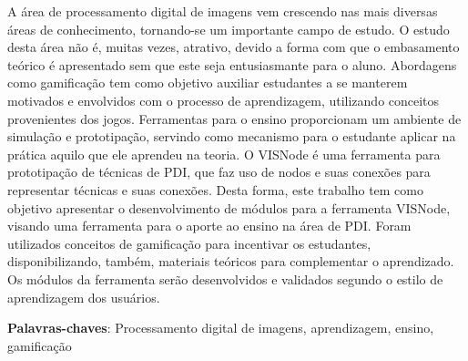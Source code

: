 \documentclass[
	12pt,				%
	oneside,			%
	a4paper,			%
	english,			%
	french,				%
	spanish,			%
	brazil,				%
	]{abntex2}
\begin{document}
\frenchspacing 


\imprimircapa
\imprimirfolhaderosto





\begin{resumo}
A área de processamento digital de imagens vem crescendo nas mais diversas áreas de conhecimento, tornando-se um importante campo de estudo. O estudo desta área não é, muitas vezes, atrativo, devido a forma com que o embasamento teórico é apresentado sem que este seja entusiasmante para o aluno. Abordagens como gamificação tem como objetivo auxiliar estudantes a se manterem motivados e envolvidos com o processo de aprendizagem, utilizando conceitos provenientes dos jogos. Ferramentas para o ensino proporcionam um ambiente de simulação e prototipação, servindo como mecanismo para o estudante aplicar na prática aquilo que ele aprendeu na teoria. O VISNode é uma ferramenta para prototipação de técnicas de PDI, que faz uso de nodos e suas conexões para representar técnicas e suas conexões. Desta forma, este trabalho tem como objetivo apresentar o desenvolvimento de módulos para a ferramenta VISNode, visando  uma ferramenta para o aporte ao ensino na área de PDI. Foram utilizados conceitos de gamificação para incentivar os estudantes, disponibilizando, também, materiais teóricos para complementar o aprendizado. Os módulos da ferramenta serão desenvolvidos e validados segundo o estilo de aprendizagem dos usuários.

 \vspace{\onelineskip}
    
 \noindent
 \textbf{Palavras-chaves}: Processamento digital de imagens, aprendizagem, ensino, gamificação
\end{resumo}
\end{document}
